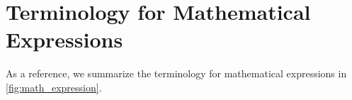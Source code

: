 \section{Terminology for Mathematical Expressions}
\label{appendix:term}
As a reference, we summarize the terminology for mathematical expressions in \autoref{fig:math_expression}.



\clearpage





